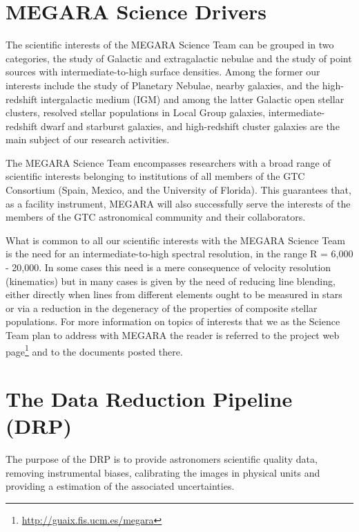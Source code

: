 \section{MEGARA Science Drivers}
The scientific interests of the MEGARA Science Team
can be grouped in two categories, the study of Galactic and extragalactic nebulae and the study of point sources with intermediate-to-high surface densities. Among the former our interests include the study of Planetary Nebulae, nearby galaxies, and the high-redshift intergalactic medium (IGM) and among the latter Galactic open stellar clusters, resolved stellar populations in Local Group galaxies, intermediate-redshift dwarf and starburst galaxies, and high-redshift cluster galaxies are the main subject of
our research activities. 

The MEGARA Science Team encompasses researchers with a broad range of scientific interests belonging to institutions of all members of the GTC Consortium (Spain, Mexico, and the University of Florida). This guarantees that, as a facility instrument, MEGARA will also successfully serve the interests of the members of the GTC astronomical community and their collaborators.

What is common to all our scientific interests with the MEGARA Science Team is the need for an intermediate-to-high spectral resolution, in the range R = 6,000 - 20,000. In some cases this need is a mere consequence of velocity resolution (kinematics) but in many cases is given by the need of reducing line blending, either directly when lines from different elements ought to be measured in stars or via a reduction in the degeneracy of the properties of composite stellar populations. For more information on topics of interests that we as the Science Team plan to address with MEGARA the reader is referred to the project web page\footnote{\url{http://guaix.fis.ucm.es/megara}} and to the documents posted there.

\section{The Data Reduction Pipeline (DRP)}
The purpose of the DRP is to provide astronomers scientific quality data,  removing instrumental biases, calibrating the images in physical units and providing a estimation of the associated uncertainties.

